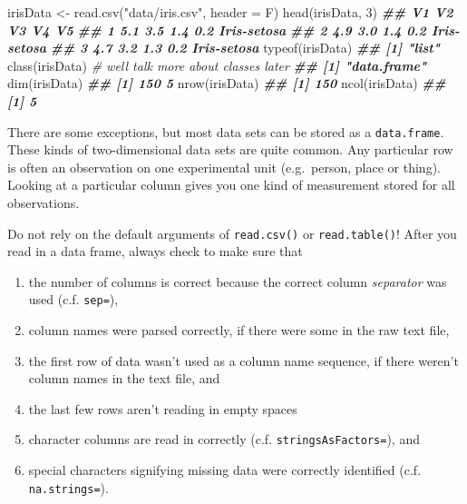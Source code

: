 \documentclass[
  12pt,
  krantz2]{krantz}
\makeatletter
\newenvironment{Shaded}{\begin{snugshade}}{\end{snugshade}}
\newcommand{\AttributeTok}[1]{\textcolor[rgb]{0.61,0.61,0.61}{#1}}
\newcommand{\CommentTok}[1]{\textcolor[rgb]{0.37,0.37,0.37}{\textit{#1}}}
\newcommand{\DecValTok}[1]{\textcolor[rgb]{0.06,0.06,0.06}{#1}}
\newcommand{\DocumentationTok}[1]{\textcolor[rgb]{0.37,0.37,0.37}{\textbf{\textit{#1}}}}
\newcommand{\FunctionTok}[1]{\textcolor[rgb]{0,0,0}{#1}}
\newcommand{\NormalTok}[1]{#1}
\newcommand{\OtherTok}[1]{\textcolor[rgb]{0.37,0.37,0.37}{#1}}
\newcommand{\StringTok}[1]{\textcolor[rgb]{0.5,0.5,0.5}{#1}}
\providecommand{\tightlist}{%
  \setlength{\itemsep}{0pt}\setlength{\parskip}{0pt}}
\newenvironment{kframe}{%
\medskip{}
\setlength{\fboxsep}{.8em}
 \def\at@end@of@kframe{}%
 \ifinner\ifhmode%
  \def\at@end@of@kframe{\end{minipage}}%
  \begin{minipage}{\columnwidth}%
 \fi\fi%
 \def\FrameCommand##1{\hskip\@totalleftmargin \hskip-\fboxsep
 \colorbox{shadecolor}{##1}\hskip-\fboxsep
     \hskip-\linewidth \hskip-\@totalleftmargin \hskip\columnwidth}%
 \MakeFramed {\advance\hsize-\width
   \@totalleftmargin\z@ \linewidth\hsize
   \@setminipage}}%
 {\par\unskip\endMakeFramed%
 \at@end@of@kframe}
\renewenvironment{Shaded}{\begin{kframe}}{\end{kframe}}
\makeatother
\begin{document}
\begin{Shaded}
\begin{Highlighting}[]
\NormalTok{irisData }\OtherTok{\textless{}{-}} \FunctionTok{read.csv}\NormalTok{(}\StringTok{"data/iris.csv"}\NormalTok{, }\AttributeTok{header =}\NormalTok{ F)}
\FunctionTok{head}\NormalTok{(irisData, }\DecValTok{3}\NormalTok{)}
\DocumentationTok{\#\#    V1  V2  V3  V4          V5}
\DocumentationTok{\#\# 1 5.1 3.5 1.4 0.2 Iris{-}setosa}
\DocumentationTok{\#\# 2 4.9 3.0 1.4 0.2 Iris{-}setosa}
\DocumentationTok{\#\# 3 4.7 3.2 1.3 0.2 Iris{-}setosa}
\FunctionTok{typeof}\NormalTok{(irisData)}
\DocumentationTok{\#\# [1] "list"}
\FunctionTok{class}\NormalTok{(irisData) }\CommentTok{\# we\textquotesingle{}ll talk more about classes later}
\DocumentationTok{\#\# [1] "data.frame"}
\FunctionTok{dim}\NormalTok{(irisData)}
\DocumentationTok{\#\# [1] 150   5}
\FunctionTok{nrow}\NormalTok{(irisData)}
\DocumentationTok{\#\# [1] 150}
\FunctionTok{ncol}\NormalTok{(irisData)}
\DocumentationTok{\#\# [1] 5}
\end{Highlighting}
\end{Shaded}

There are some exceptions, but most data sets can be stored as a \texttt{data.frame}. These kinds of two-dimensional data sets are quite common. Any particular row is often an observation on one experimental unit (e.g.~person, place or thing). Looking at a particular column gives you one kind of measurement stored for all observations.

\begin{rmd-caution}

Do not rely on the default arguments of \texttt{read.csv()} or \texttt{read.table()}! After you read in a data frame, always check to make sure that

\begin{enumerate}
\def\labelenumi{\arabic{enumi}.}
\tightlist
\item
  the number of columns is correct because the correct column \emph{separator} was used (c.f. \texttt{sep=}),
\item
  column names were parsed correctly, if there were some in the raw text file,
\item
  the first row of data wasn't used as a column name sequence, if there weren't column names in the text file, and
\item
  the last few rows aren't reading in empty spaces
\item
  character columns are read in correctly (c.f. \texttt{stringsAsFactors=}), and
\item
  special characters signifying missing data were correctly identified (c.f. \texttt{na.strings=}).
\end{enumerate}

\end{rmd-caution}
\end{document}
